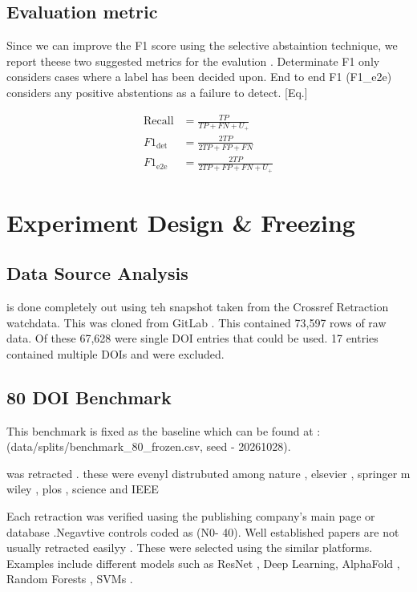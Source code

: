 \documentclass[10pt,a4paper,twocolumn]{article}
\begin{document}
\subsection{Evaluation metric}

Since we can improve the F1 score using the selective abstaintion technique, we report theese two  suggested metrics for the evalution . Determinate F1 only considers cases where a label has been decided upon. End to end F1 (F1\_e2e) considers any positive abstentions as a failure to detect. [Eq.]


\begin{equation*}\begin{aligned}
\mathrm{Recall}&=\frac{TP}{TP+FN+U_{+}}\\[2pt]
F1_{\mathrm{det}}&=\frac{2TP}{2TP+FP+FN}\\[2pt]
F1_{\mathrm{e2e}}&=\frac{2TP}{2TP+FP+FN+U_{+}}
\end{aligned}\end{equation*}


\section{Experiment Design \& Freezing}

\subsection{Data Source Analysis}

is done completely  out using teh snapshot taken from the Crossref Retraction watchdata. This was cloned from GitLab . This contained 73,597 rows of raw data. Of these 67,628 were single DOI entries that could be used. 17 entries contained multiple DOIs and were excluded.


\subsection{80 DOI Benchmark}

This benchmark is fixed as the baseline which can be found at : (data/splits/benchmark\_80\_frozen.csv, seed - 20261028).

was retracted . these were evenyl distrubuted among nature , elsevier , springer m wiley , plos , science and IEEE

Each retraction was verified uasing the publishing company's main page or database .Negavtive controls coded as (N0- 40). Well established papers are not usually retracted easilyy . These were selected using the similar platforms. Examples include different models such as ResNet , Deep Learning, AlphaFold , Random Forests , SVMs .
\end{document}
